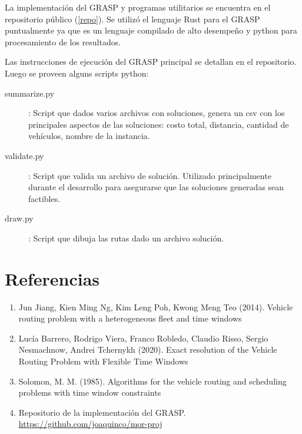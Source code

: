 \documentclass{article}
\begin{document}
  La implementación del GRASP y programas utilitarios se encuentra en el repositorio público (\ref{repo}). Se utilizó el lenguaje Rust para el GRASP puntualmente ya que es un lenguaje compilado de alto desempeño y python para procesamiento de los resultados.

  Las instrucciones de ejecución del GRASP principal se detallan en el repositorio. Luego se proveen alguns scripts python:
  \begin{description}
    \item[summarize.py]: Script que dados varios archivos con soluciones, genera un csv con los principales aspectos de las soluciones: costo total, distancia, cantidad de vehículos, nombre de la instancia.
    \item[validate.py]: Script que valida un archivo de solución. Utilizado principalmente durante el desarrollo para asegurarse que las soluciones generadas sean factibles.
    \item[draw.py]: Script que dibuja las rutas dado un archivo solución.
  \end{description}

  \section*{Referencias}

  \begin{enumerate}
    \item{\label{jiang} Jun Jiang, Kien Ming Ng, Kim Leng Poh, Kwong Meng Teo (2014). Vehicle routing problem with a heterogeneous fleet and time windows}
    \item{\label{inco} Lucía Barrero, Rodrigo Viera, Franco Robledo, Claudio Risso, Sergio Nesmachnow, Andrei Tchernykh (2020). Exact resolution of the Vehicle Routing Problem with Flexible Time Windows}
    \item{\label{solomon} Solomon, M. M. (1985). Algorithms for the vehicle routing and scheduling problems with time window constraints}
    \item{\label{repo} Repositorio de la implementación del GRASP. \url{https://github.com/joaquinco/mor-proj}}
  \end{enumerate}
\end{document}
